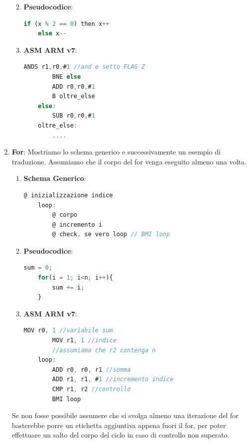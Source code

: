 \documentclass{article}
\begin{document}
\begin{enumerate}
\begin{enumerate}
\newpage

\vspace*{-20px}

        \item \textbf{Pseudocodice}: 
\begin{lstlisting}[language = JavaScript]
    if (x % 2 == 0) then x++
    else x--
\end{lstlisting}

        \item \textbf{ASM ARM v7}: 
\begin{lstlisting}[language = JavaScript]
        ANDS r1,r0,#1 //and e setto FLAG Z
        BNE else
        ADD r0,r0,#1
        B oltre_else
    else:
        SUB r0,r0,#1
    oltre_else:
        ....
\end{lstlisting}
    \end{enumerate}

    \item \textbf{For}: Mostriamo lo schema generico e successivamente un esempio di traduzione. Assumiamo che il corpo del for venga eseguito almeno una volta.
    \begin{enumerate}
        \item \textbf{Schema Generico}: 
\begin{lstlisting}[language = JavaScript]
        @ inizializzazione indice
    loop:
        @ corpo
        @ incremento i
        @ check, se vero loop // BMI loop
\end{lstlisting}
        \item \textbf{Pseudocodice}: 
\begin{lstlisting}[language = JavaScript]
    sum = 0;
    for(i = 1; i<n; i++){
        sum += i;
    }
\end{lstlisting}

        \item \textbf{ASM ARM v7}: 
\begin{lstlisting}[language = JavaScript]
        MOV r0, 1 //variabile sum
        MOV r1, 1 //indice
        //assumiamo che r2 contenga n
    loop:
        ADD r0, r0, r1 //somma
        ADD r1, r1, #1 //incremento indice
        CMP r1, r2 //controllo
        BMI loop
\end{lstlisting}
    \end{enumerate}

Se non fosse possibile assumere che si svolga almeno una iterazione del for basterebbe porre un etichetta aggiuntiva appena fuori il for, per poter effettuare un salto del corpo del ciclo in caso di controllo non superato.


\end{enumerate}
\end{document}
